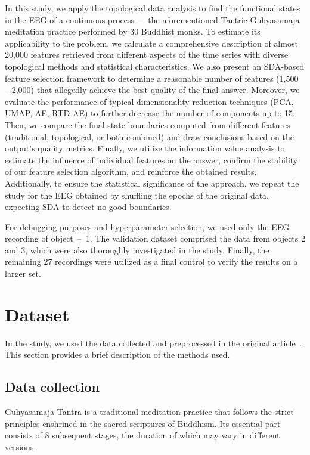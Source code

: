 \documentclass[10pt,lettersize,journal]{IEEEtran}
\begin{document}
In this study, we apply the topological data analysis to find the functional states in the EEG of a continuous process --- the aforementioned Tantric Guhyasamaja meditation practice performed by 30 Buddhist monks. To estimate its applicability to the problem, we calculate a comprehensive description of almost 20,000 features retrieved from different aspects of the time series with diverse topological methods and statistical characteristics. We also present an SDA-based feature selection framework to determine a reasonable number of features (1,500 -- 2,000) that allegedly achieve the best quality of the final answer. Moreover, we evaluate the performance of typical dimensionality reduction techniques (PCA, UMAP, AE, RTD AE) to further decrease the number of components up to 15. Then, we compare the final state boundaries computed from different features (traditional, topological, or both combined) and draw conclusions based on the output's quality metrics. Finally, we utilize the information value analysis to estimate the influence of individual features on the answer, confirm the stability of our feature selection algorithm, and reinforce the obtained results. Additionally, to ensure the statistical significance of the approach, we repeat the study for the EEG obtained by shuffling the epochs of the original data, expecting SDA to detect no good boundaries.

For debugging purposes and hyperparameter selection, we used only the EEG recording of object~\mbox{--}~1. The validation dataset comprised the data from objects 2 and 3, which were also thoroughly investigated in the study. Finally, the remaining 27 recordings were utilized as a final control to verify the results on a larger set. 

\section{Dataset}

In the study, we used the data collected and preprocessed in the original article~\cite{SDA}. This section provides a brief description of the methods used.

\subsection{Data collection}

Guhyasamaja Tantra is a traditional meditation practice that follows the strict principles enshrined in the sacred scriptures of Buddhism. Its essential part consists of 8 subsequent stages, the duration of which may vary in different versions.
\end{document}
